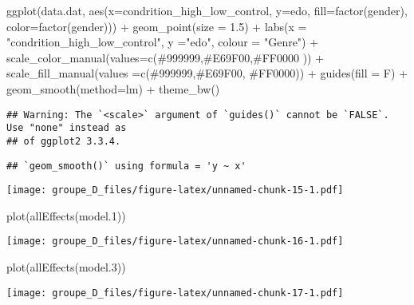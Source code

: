 \documentclass[
]{article}
\newenvironment{Shaded}{\begin{snugshade}}{\end{snugshade}}
\newcommand{\AttributeTok}[1]{\textcolor[rgb]{0.77,0.63,0.00}{#1}}
\newcommand{\FloatTok}[1]{\textcolor[rgb]{0.00,0.00,0.81}{#1}}
\newcommand{\FunctionTok}[1]{\textcolor[rgb]{0.00,0.00,0.00}{#1}}
\newcommand{\NormalTok}[1]{#1}
\newcommand{\SpecialCharTok}[1]{\textcolor[rgb]{0.00,0.00,0.00}{#1}}
\newcommand{\StringTok}[1]{\textcolor[rgb]{0.31,0.60,0.02}{#1}}
\begin{document}
\begin{Shaded}
\begin{Highlighting}[]
\FunctionTok{ggplot}\NormalTok{(data.dat, }\FunctionTok{aes}\NormalTok{(}\AttributeTok{x=}\NormalTok{condrition\_high\_low\_control, }\AttributeTok{y=}\NormalTok{edo, }\AttributeTok{fill=}\FunctionTok{factor}\NormalTok{(gender), }\AttributeTok{color=}\FunctionTok{factor}\NormalTok{(gender))) }\SpecialCharTok{+} 
        \FunctionTok{geom\_point}\NormalTok{(}\AttributeTok{size =} \FloatTok{1.5}\NormalTok{) }\SpecialCharTok{+} 
        \FunctionTok{labs}\NormalTok{(}\AttributeTok{x =} \StringTok{"condrition\_high\_low\_control"}\NormalTok{, }\AttributeTok{y =}\StringTok{"edo"}\NormalTok{, }\AttributeTok{colour =} \StringTok{"Genre"}\NormalTok{) }\SpecialCharTok{+}
        \FunctionTok{scale\_color\_manual}\NormalTok{(}\AttributeTok{values=}\FunctionTok{c}\NormalTok{(}\StringTok{\textquotesingle{}\#999999\textquotesingle{}}\NormalTok{,}\StringTok{\textquotesingle{}\#E69F00\textquotesingle{}}\NormalTok{,}\StringTok{\textquotesingle{}\#FF0000\textquotesingle{}}\NormalTok{ )) }\SpecialCharTok{+}
        \FunctionTok{scale\_fill\_manual}\NormalTok{(}\AttributeTok{values =}\FunctionTok{c}\NormalTok{(}\StringTok{\textquotesingle{}\#999999\textquotesingle{}}\NormalTok{,}\StringTok{\textquotesingle{}\#E69F00\textquotesingle{}}\NormalTok{, }\StringTok{\textquotesingle{}\#FF0000\textquotesingle{}}\NormalTok{)) }\SpecialCharTok{+}
        \FunctionTok{guides}\NormalTok{(}\AttributeTok{fill =}\NormalTok{ F) }\SpecialCharTok{+}
        \FunctionTok{geom\_smooth}\NormalTok{(}\AttributeTok{method=}\NormalTok{lm) }\SpecialCharTok{+}
        \FunctionTok{theme\_bw}\NormalTok{()}
\end{Highlighting}
\end{Shaded}

\begin{verbatim}
## Warning: The `<scale>` argument of `guides()` cannot be `FALSE`. Use "none" instead as
## of ggplot2 3.3.4.
\end{verbatim}

\begin{verbatim}
## `geom_smooth()` using formula = 'y ~ x'
\end{verbatim}

\texttt{[image: groupe\_D\_files/figure-latex/unnamed-chunk-15-1.pdf]}

\begin{Shaded}
\begin{Highlighting}[]
\FunctionTok{plot}\NormalTok{(}\FunctionTok{allEffects}\NormalTok{(model}\FloatTok{.1}\NormalTok{))}
\end{Highlighting}
\end{Shaded}

\texttt{[image: groupe\_D\_files/figure-latex/unnamed-chunk-16-1.pdf]}

\begin{Shaded}
\begin{Highlighting}[]
\FunctionTok{plot}\NormalTok{(}\FunctionTok{allEffects}\NormalTok{(model}\FloatTok{.3}\NormalTok{))}
\end{Highlighting}
\end{Shaded}

\texttt{[image: groupe\_D\_files/figure-latex/unnamed-chunk-17-1.pdf]}
\end{document}
